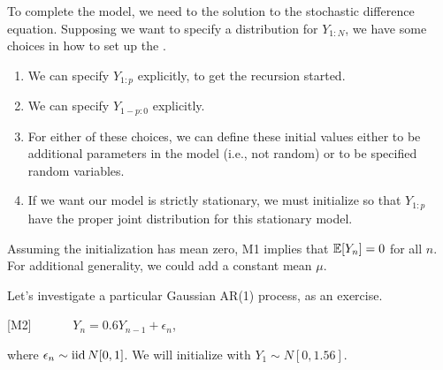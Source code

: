 \begin{frame}[fragile]

\bi

\item To complete the model, we need to  the solution to the stochastic difference equation. Supposing we want to specify a distribution for $Y_{1:N}$, we have some choices in how to set up the .

\ei
\begin{enumerate}
   \item We can specify $Y_{1:p}$ explicitly, to get the recursion started.

    \item We can specify $Y_{1-p:0}$ explicitly.

    \item  For either of these choices, we can define these initial values either to be additional parameters in the model (i.e., not random) or to be specified random variables.

    \item If we want our model is strictly stationary, we must initialize so that $Y_{1:p}$ have the proper joint distribution for this stationary model.

\end{enumerate}

\bi

\item Assuming the initialization has mean zero, M1 implies that $\mathbb{E}[Y_n]=0$ for all $n$. For additional generality, we could add a constant mean $\mu$.

\item Let's investigate a particular Gaussian AR(1) process, as an exercise.

\vspace{2mm}

[M2] $\quad\quad \quad Y_n = 0.6 Y_{n-1}+ \epsilon_n$,

\vspace{2mm}

where $\epsilon_n\sim \mathrm{iid}\, N[0,1]$. We will initialize with $Y_1\sim N[0,1.56]$.

\ei

\end{frame} 




